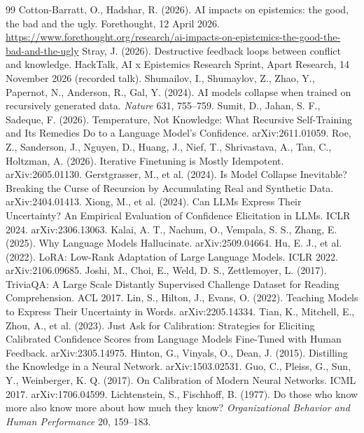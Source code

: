 \documentclass[10pt]{article}
\begin{document}
\begin{thebibliography}{99}\small
{} Cotton-Barratt, O., Hadshar, R. (2026). AI impacts on epistemics: the good, the bad and the ugly. Forethought, 12 April 2026. \url{https://www.forethought.org/research/ai-impacts-on-epistemics-the-good-the-bad-and-the-ugly}
 Stray, J. (2026). Destructive feedback loops between conflict and knowledge. HackTalk, AI x Epistemics Research Sprint, Apart Research, 14 November 2026 (recorded talk).
 Shumailov, I., Shumaylov, Z., Zhao, Y., Papernot, N., Anderson, R., Gal, Y. (2024). AI models collapse when trained on recursively generated data. \emph{Nature} 631, 755--759.
 Sumit, D., Jahan, S. F., Sadeque, F. (2026). Temperature, Not Knowledge: What Recursive Self-Training and Its Remedies Do to a Language Model's Confidence. arXiv:2611.01059.
 Roe, Z., Sanderson, J., Nguyen, D., Huang, J., Nief, T., Shrivastava, A., Tan, C., Holtzman, A. (2026). Iterative Finetuning is Mostly Idempotent. arXiv:2605.01130.
 Gerstgrasser, M., et al. (2024). Is Model Collapse Inevitable? Breaking the Curse of Recursion by Accumulating Real and Synthetic Data. arXiv:2404.01413.
 Xiong, M., et al. (2024). Can LLMs Express Their Uncertainty? An Empirical Evaluation of Confidence Elicitation in LLMs. ICLR 2024. arXiv:2306.13063.
 Kalai, A. T., Nachum, O., Vempala, S. S., Zhang, E. (2025). Why Language Models Hallucinate. arXiv:2509.04664.
 Hu, E. J., et al. (2022). LoRA: Low-Rank Adaptation of Large Language Models. ICLR 2022. arXiv:2106.09685.
 Joshi, M., Choi, E., Weld, D. S., Zettlemoyer, L. (2017). TriviaQA: A Large Scale Distantly Supervised Challenge Dataset for Reading Comprehension. ACL 2017.
 Lin, S., Hilton, J., Evans, O. (2022). Teaching Models to Express Their Uncertainty in Words. arXiv:2205.14334.
 Tian, K., Mitchell, E., Zhou, A., et al. (2023). Just Ask for Calibration: Strategies for Eliciting Calibrated Confidence Scores from Language Models Fine-Tuned with Human Feedback. arXiv:2305.14975.
 Hinton, G., Vinyals, O., Dean, J. (2015). Distilling the Knowledge in a Neural Network. arXiv:1503.02531.
 Guo, C., Pleiss, G., Sun, Y., Weinberger, K. Q. (2017). On Calibration of Modern Neural Networks. ICML 2017. arXiv:1706.04599.
 Lichtenstein, S., Fischhoff, B. (1977). Do those who know more also know more about how much they know? \emph{Organizational Behavior and Human Performance} 20, 159--183.

\end{thebibliography}
\end{document}
